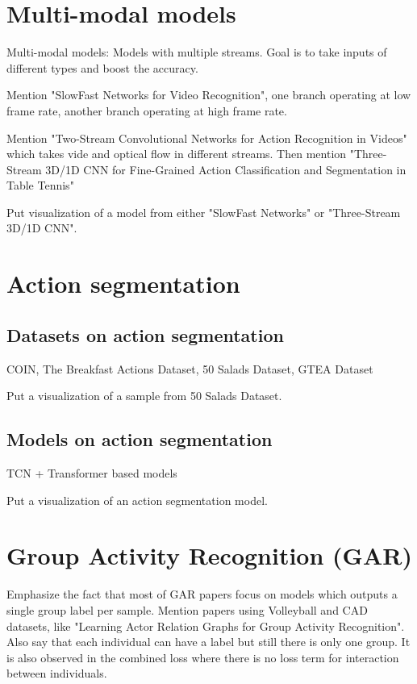 \documentclass[doctype=mastersthesis,lang=english,BCOR=15mm,biblatex]{ldvbook}
\begin{document}
\section{Multi-modal models}

Multi-modal models: Models with multiple streams. Goal is to take inputs of different types and boost the accuracy.

Mention "SlowFast Networks for Video Recognition", one branch operating at low frame rate, another branch operating at high frame rate.

Mention "Two-Stream Convolutional Networks for Action Recognition in Videos" which takes vide and optical flow in different streams. Then mention "Three-Stream 3D/1D CNN for Fine-Grained Action Classification and Segmentation in Table Tennis"

Put visualization of a model from either "SlowFast Networks" or "Three-Stream 3D/1D CNN".

\section{Action segmentation}

\subsection{Datasets on action segmentation}

COIN, The Breakfast Actions Dataset, 50 Salads Dataset, GTEA Dataset

Put a visualization of a sample from 50 Salads Dataset.

\subsection{Models on action segmentation}

TCN + Transformer based models

Put a visualization of an action segmentation model.

\section{Group Activity Recognition (GAR)}

Emphasize the fact that most of GAR papers focus on models which outputs a single group label per sample. Mention papers using Volleyball and CAD datasets, like "Learning Actor Relation Graphs for Group Activity Recognition". Also say that each individual can have a label but still there is only one group. It is also observed in the combined loss where there is no loss term for interaction between individuals.
\end{document}
